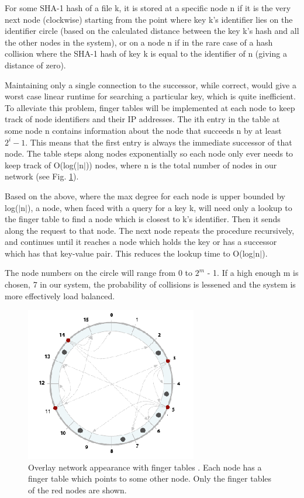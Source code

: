 \documentclass[fleqn,24pt]{SelfArx} %
\begin{document}
For some SHA-1 hash of a file k, it is stored at a specific node n if it is the very next node (clockwise) starting from the point where key k's identifier lies on the identifier circle (based on the calculated distance between the key k's hash and all the other nodes in the system), or on a node n if in the rare case of a hash collision where the SHA-1 hash of key k is equal to the identifier of n (giving a distance of zero). 

Maintaining only a single connection to the successor, while correct, would give a worst case linear runtime for searching a particular key, which is quite inefficient. To alleviate this problem, finger tables \cite{1} will be implemented at each node to keep track of node identifiers and their IP addresses. The ith entry in the table at some node n contains information about the node that succeeds n by at least $2^i - 1$. This means that the first entry is always the immediate successor of that node. The table steps along nodes exponentially so each node only ever needs to keep track of O(log($|$n$|$)) nodes, where n is the total number of nodes in our network (see Fig. \ref{2}).

Based on the above, where the max degree for each node is upper bounded by log($|$n$|$), a node, when faced with a query for a key k, will need only a lookup to the finger table to find a node which is closest to k’s identifier. Then it sends along the request to that node. The next node repeats the procedure recursively, and continues until it reaches a node which holds the key or has a successor which has that key-value pair. This reduces the lookup time to O(log$|$n$|$).

The node numbers on the circle will range from 0 to $2^m$ - 1. If a high enough m is chosen, 7 in our system, the probability of collisions is lessened and the system is more effectively load balanced. 

\begin{figure}[!htb]
\includegraphics{Selection_155.png}
\caption{\label{family}Overlay network appearance with finger tables \cite{1}. Each node has a finger table which points to some other node. Only the finger tables of the red nodes are shown.}
\label{2}
\end{figure}
\end{document}
